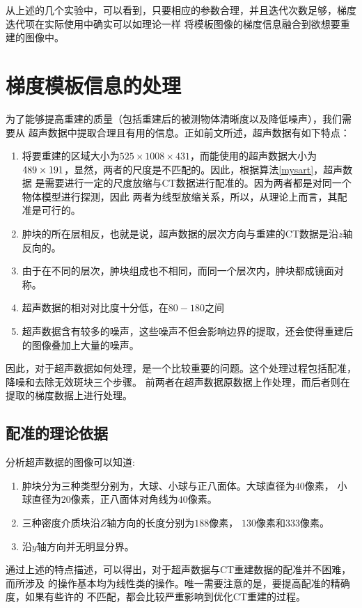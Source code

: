 从上述的几个实验中，可以看到，只要相应的参数合理，并且迭代次数足够，梯度迭代项在实际使用中确实可以如理论一样
将模板图像的梯度信息融合到欲想要重建的图像中。



\section{梯度模板信息的处理}\label{sec:gradprocess}
为了能够提高重建的质量（包括重建后的被测物体清晰度以及降低噪声），我们需要从
超声数据中提取合理且有用的信息。正如前文所述，超声数据有如下特点：
\begin{enumerate}
\item 将要重建的区域大小为$525\times1008\times431$，而能使用的超声数据大小为
$489\times191\time498$，显然，两者的尺度是不匹配的。因此，根据算法\ref{mysart}，超声数据
是需要进行一定的尺度放缩与CT数据进行配准的。因为两者都是对同一个物体模型进行探测，因此
两者为线型放缩关系，所以，从理论上而言，其配准是可行的。
\item 肿块的所在层相反，也就是说，超声数据的层次方向与重建的CT数据是沿$z$轴反向的。
\item 由于在不同的层次，肿块组成也不相同，而同一个层次内，肿块都成镜面对称。
\item 超声数据的相对对比度十分低，在$80-180$之间
\item 超声数据含有较多的噪声，这些噪声不但会影响边界的提取，还会使得重建后的图像叠加上大量的噪声。
\end{enumerate}

因此，对于超声数据如何处理，是一个比较重要的问题。这个处理过程包括配准，降噪和去除无效斑块三个步骤。
前两者在超声数据原数据上作处理，而后者则在提取的梯度数据上进行处理。
\subsection{配准的理论依据}
分析超声数据的图像可以知道:
\begin{enumerate}
\item 肿块分为三种类型分别为，大球、小球与正八面体。大球直径为$40$像素，
小球直径为$20$像素，正八面体对角线为$40$像素。
\item 三种密度介质块沿$Z$轴方向的长度分别为$188$像素，
$130$像素和$333$像素。
\item 沿$y$轴方向并无明显分界。
\end{enumerate}

通过上述的特点描述，可以得出，对于超声数据与CT重建数据的配准并不困难，而所涉及
的操作基本均为线性类的操作。唯一需要注意的是，要提高配准的精确度，如果有些许的
不匹配，都会比较严重影响到优化CT重建的过程。

